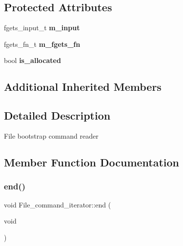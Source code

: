 \subsection*{Protected Attributes}
\begin{DoxyCompactItemize}
\item 
\mbox{\label{classFile__command__iterator_a1a8b95dfcf0cebe2d373582be0071184}} 
fgets\+\_\+input\+\_\+t {\bfseries m\+\_\+input}
\item 
\mbox{\label{classFile__command__iterator_ab56af1872b6b6ddea2728d5ed5c3b3f4}} 
fgets\+\_\+fn\+\_\+t {\bfseries m\+\_\+fgets\+\_\+fn}
\item 
\mbox{\label{classFile__command__iterator_af5bd70cc6f28f04cc3efcd4fceed4f58}} 
bool {\bfseries is\+\_\+allocated}
\end{DoxyCompactItemize}
\subsection*{Additional Inherited Members}


\subsection{Detailed Description}
File bootstrap command reader 

\subsection{Member Function Documentation}
\mbox{\label{classFile__command__iterator_ad12ce1809b043f8966fcab2e70e1a1dd}} 
\subsubsection{\texorpdfstring{end()}{end()}}
{\footnotesize\ttfamily void File\+\_\+command\+\_\+iterator\+::end (\begin{DoxyParamCaption}\item[{void}]{ }\end{DoxyParamCaption})\hspace{0.3cm}{\ttfamily [virtual]}}

